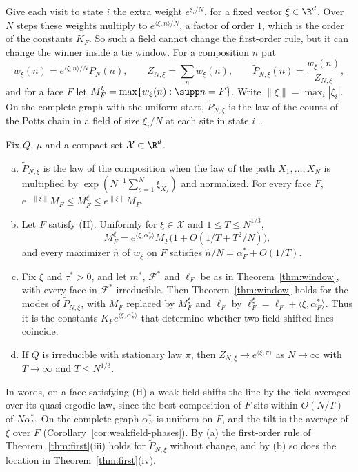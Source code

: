 Give each visit to state $i$ the extra weight $e^{\xi_i/N}$, for a fixed vector
$\xi\in\R^d$. Over $N$ steps these weights multiply to $e^{\langle\xi,n\rangle/N}$, a
factor of order $1$, which is the order of the constants $K_F$. So such a field cannot
change the first-order rule, but it can change the winner inside a tie window. For a
composition $n$ put
\[
w_\xi(n)=e^{\langle\xi,n\rangle/N}P_N(n),\qquad Z_{N,\xi}=\sum_nw_\xi(n),\qquad
\widetilde P_{N,\xi}(n)=\frac{w_\xi(n)}{Z_{N,\xi}},
\]
and for a face $F$ let $M^\xi_F=\max\{w_\xi(n):\supp n=F\}$. Write
$\lVert\xi\rVert=\max_i|\xi_i|$. On the complete graph with the uniform start,
$\widetilde P_{N,\xi}$ is the law of
the counts of the Potts chain in a field of size $\xi_i/N$ at each site in state
$i$~\cite{paperB}.

\begin{proposition}\label{prop:weakfield}
Fix $Q$, $\mu$ and a compact set $\mathcal X\subset\R^d$.
\begin{enumerate}[(a)]
\item $\widetilde P_{N,\xi}$ is the law of the composition when the law of the path
$X_1,\dots,X_N$ is multiplied by $\exp(N^{-1}\sum_{s=1}^N\xi_{X_s})$ and normalized. For
every face $F$, $e^{-\lVert\xi\rVert}M_F\le M^\xi_F\le e^{\lVert\xi\rVert}M_F$.
\item Let $F$ satisfy \textup{(H)}. Uniformly for $\xi\in\mathcal X$ and $1\le T\le N^{1/3}$,
\[
M^\xi_F=e^{\langle\xi,\alpha^*_F\rangle}M_F\bigl(1+O(1/T+T^2/N)\bigr),
\]
and every maximizer $\hat n$ of $w_\xi$ on $F$ satisfies $\hat n/N=\alpha^*_F+O(1/T)$.
\item Fix $\xi$ and $\tau^*>0$, and let $m^*$, $\mathcal F^*$ and $\ell_F$ be as in
Theorem~\ref{thm:window}, with every face in $\mathcal F^*$ irreducible. Then
Theorem~\ref{thm:window} holds for the modes of $\widetilde P_{N,\xi}$, with $M_F$
replaced by $M^\xi_F$ and $\ell_F$ by $\ell^\xi_F=\ell_F+\langle\xi,\alpha^*_F\rangle$.
Thus it is the constants $K_Fe^{\langle\xi,\alpha_F^*\rangle}$ that determine whether
two field-shifted lines coincide.
\item If $Q$ is irreducible with stationary law $\pi$, then
$Z_{N,\xi}\to e^{\langle\xi,\pi\rangle}$ as $N\to\infty$ with $T\to\infty$ and $T\le N^{1/3}$.
\end{enumerate}
\end{proposition}

In words, on a face satisfying (H) a weak field shifts the line by the field
averaged over its quasi-ergodic law, since the best composition of $F$ sits within $O(N/T)$ of
$N\alpha^*_F$. On the complete graph $\alpha^*_F$ is uniform on $F$, and the tilt is the
average of $\xi$ over $F$ (Corollary~\ref{cor:weakfield-phases}). By (a) the first-order
rule of Theorem~\ref{thm:first}(iii) holds for $\widetilde P_{N,\xi}$ without change, and by
(b) so does the location in Theorem~\ref{thm:first}(iv).

